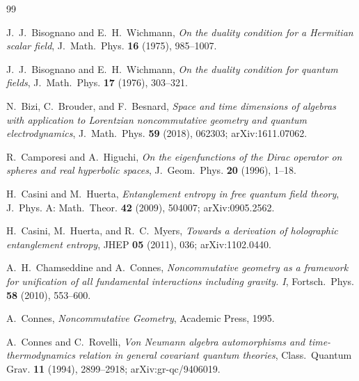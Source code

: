 \documentclass[11pt,a4paper]{article}
\theoremstyle{plain}
\theoremstyle{definition}
\begin{document}

\begin{thebibliography}{99}

J.~J.~Bisognano and E.~H.~Wichmann,
\newblock \emph{On the duality condition for a Hermitian scalar field},
\newblock J.~Math.~Phys. \textbf{16} (1975), 985--1007.

J.~J.~Bisognano and E.~H.~Wichmann,
\newblock \emph{On the duality condition for quantum fields},
\newblock J.~Math.~Phys. \textbf{17} (1976), 303--321.

N.~Bizi, C.~Brouder, and F.~Besnard,
\newblock \emph{Space and time dimensions of algebras with
application to Lorentzian noncommutative geometry and quantum
electrodynamics},
\newblock J.~Math.~Phys. \textbf{59} (2018), 062303;
\newblock arXiv:1611.07062.

R.~Camporesi and A.~Higuchi,
\newblock \emph{On the eigenfunctions of the Dirac operator on
spheres and real hyperbolic spaces},
\newblock J.~Geom.~Phys. \textbf{20} (1996), 1--18.

H.~Casini and M.~Huerta,
\newblock \emph{Entanglement entropy in free quantum field theory},
\newblock J.~Phys. A: Math.~Theor. \textbf{42} (2009), 504007;
\newblock arXiv:0905.2562.

H.~Casini, M.~Huerta, and R.~C.~Myers,
\newblock \emph{Towards a derivation of holographic entanglement
entropy},
\newblock JHEP \textbf{05} (2011), 036;
\newblock arXiv:1102.0440.

A.~H.~Chamseddine and A.~Connes,
\newblock \emph{Noncommutative geometry as a framework for
unification of all fundamental interactions including gravity. I},
\newblock Fortsch.~Phys. \textbf{58} (2010), 553--600.

A.~Connes,
\newblock \emph{Noncommutative Geometry},
\newblock Academic Press, 1995.

A.~Connes and C.~Rovelli,
\newblock \emph{Von Neumann algebra automorphisms and
time-thermodynamics relation in general covariant quantum theories},
\newblock Class.~Quantum Grav. \textbf{11} (1994), 2899--2918;
\newblock arXiv:gr-qc/9406019.


\end{thebibliography}
\end{document}
